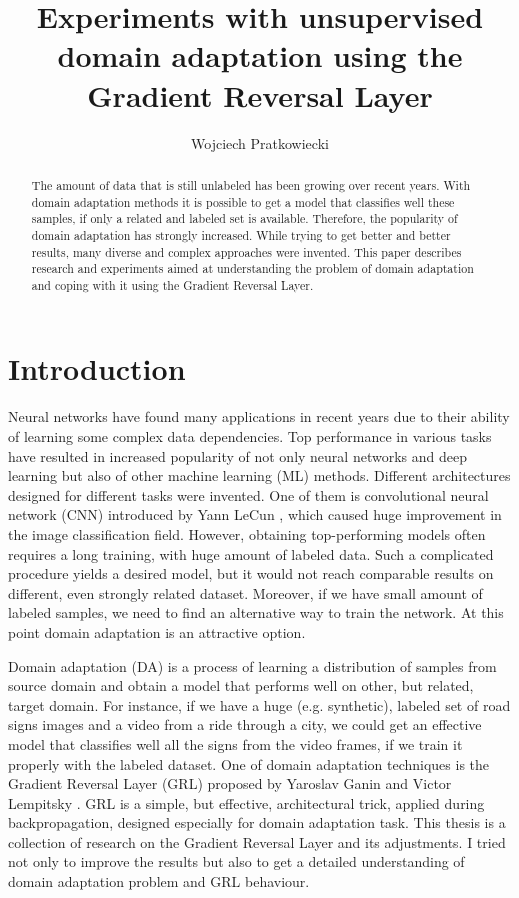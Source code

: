 \documentclass{article}
\title{Experiments with unsupervised domain adaptation using the Gradient Reversal Layer}
\author{Wojciech Pratkowiecki}
\begin{document}
\maketitle

\begin{abstract}
The amount of data that is still unlabeled has been growing over recent years. With domain adaptation methods it is possible to get a model that classifies well these samples, if only a related and labeled set is available. Therefore, the popularity of domain adaptation has strongly increased. While trying to get better and better results, many diverse and complex approaches were invented. This paper describes research and experiments aimed at understanding the problem of domain adaptation and coping with it using the Gradient Reversal Layer.
\end{abstract}

\section{Introduction}
Neural networks have found many applications in recent years due to their ability of learning some complex data dependencies. Top performance in various tasks have resulted in increased popularity of not only neural networks and deep learning but also of other machine learning (ML) methods. Different architectures designed for different tasks were invented. One of them is convolutional neural network (CNN) introduced by Yann LeCun \cite{cnn}, which caused huge improvement in the image classification field. However, obtaining top-performing models often requires a long training, with huge amount of labeled data. Such a complicated procedure yields a desired model, but it would not reach comparable results on different, even strongly related dataset. Moreover, if we  have small amount of labeled samples, we need to find an alternative way to train the network. At this point domain adaptation is an attractive option.
\par
Domain adaptation (DA) is a process of learning a distribution of samples from source domain and obtain a model that performs well on other, but related, target domain. For instance, if we have a huge (e.g. synthetic), labeled set of road signs images and a video from a ride through a city, we could get an effective model that classifies well all the signs from the video frames, if we train it properly with the labeled dataset. One of domain adaptation techniques is the Gradient Reversal Layer (GRL) proposed by Yaroslav Ganin and Victor Lempitsky \cite{pmlr-v37-ganin15}. GRL is a simple, but effective, architectural trick, applied during backpropagation, designed especially for domain adaptation task. This thesis is a collection of research on the Gradient Reversal Layer and its adjustments. I tried not only to improve the results but also to get a detailed understanding of domain adaptation problem and GRL behaviour.
\end{document}
